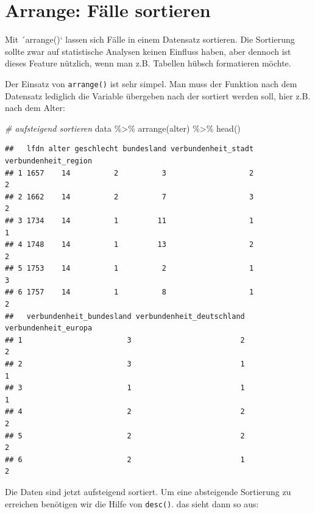 \documentclass[
]{book}
\newenvironment{Shaded}{\begin{snugshade}}{\end{snugshade}}
\newcommand{\CommentTok}[1]{\textcolor[rgb]{0.56,0.35,0.01}{\textit{#1}}}
\newcommand{\FunctionTok}[1]{\textcolor[rgb]{0.00,0.00,0.00}{#1}}
\newcommand{\NormalTok}[1]{#1}
\newcommand{\SpecialCharTok}[1]{\textcolor[rgb]{0.00,0.00,0.00}{#1}}
\begin{document}
\hypertarget{arrange-fuxe4lle-sortieren}{%
\section{Arrange: Fälle sortieren}\label{arrange-fuxe4lle-sortieren}}

Mit ´arrange()` lassen sich Fälle in einem Datensatz sortieren. Die Sortierung sollte zwar auf statistische Analysen keinen Einfluss haben, aber dennoch ist dieses Feature nützlich, wenn man z.B. Tabellen hübsch formatieren möchte.

Der Einsatz von \texttt{arrange()} ist sehr simpel. Man muss der Funktion nach dem Datensatz lediglich die Variable übergeben nach der sortiert werden soll, hier z.B. nach dem Alter:

\begin{Shaded}
\begin{Highlighting}[]
\CommentTok{\# aufsteigend sortieren}
\NormalTok{data }\SpecialCharTok{\%\textgreater{}\%} 
  \FunctionTok{arrange}\NormalTok{(alter) }\SpecialCharTok{\%\textgreater{}\%} 
  \FunctionTok{head}\NormalTok{()}
\end{Highlighting}
\end{Shaded}

\begin{verbatim}
##   lfdn alter geschlecht bundesland verbundenheit_stadt verbundenheit_region
## 1 1657    14          2          3                   2                    2
## 2 1662    14          2          7                   3                    2
## 3 1734    14          1         11                   1                    1
## 4 1748    14          1         13                   2                    2
## 5 1753    14          1          2                   1                    3
## 6 1757    14          1          8                   1                    2
##   verbundenheit_bundesland verbundenheit_deutschland verbundenheit_europa
## 1                        3                         2                    2
## 2                        3                         1                    1
## 3                        1                         1                    1
## 4                        2                         2                    2
## 5                        2                         2                    2
## 6                        2                         1                    2
\end{verbatim}

Die Daten sind jetzt aufsteigend sortiert. Um eine absteigende Sortierung zu erreichen benötigen wir die Hilfe von \texttt{desc()}. das sieht dann so aus:
\end{document}
